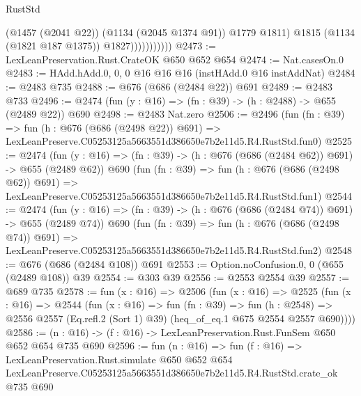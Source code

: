 \begin{lexlean}{RustStd}
\begin{coremodule}
                            (@1457 (@2041 @22))
                            (@1134 (@2045 @1374 @91))
                            @1779
                            @1811)
                          @1815
                          (@1134 (@1821 @187 @1375))
                          @1827)))))))))))
@2473 := LexLeanPreservation.Rust.CrateOK @650 @652 @654
@2474 := Nat.casesOn.{0}
@2483 := HAdd.hAdd.{0, 0, 0} @16 @16 @16 (instHAdd.{0} @16 instAddNat)
@2484 := @2483 @735
@2488 := @676 (@686 (@2484 @22)) @691
@2489 := @2483 @733
@2496 := @2474 (fun (y : @16) => (fn : @39) -> (h : @2488) -> @655 (@2489 @22)) @690
@2498 := @2483 Nat.zero
@2506 := @2496
    (fun (fn : @39) =>
    fun (h : @676 (@686 (@2498 @22)) @691) =>
    LexLeanPreserve.C05253125a5663551d386650e7b2e11d5.R4.RustStd.fun0)
@2525 := @2474
    (fun (y : @16) => (fn : @39) -> (h : @676 (@686 (@2484 @62)) @691) -> @655 (@2489 @62))
    @690
    (fun (fn : @39) =>
    fun (h : @676 (@686 (@2498 @62)) @691) =>
    LexLeanPreserve.C05253125a5663551d386650e7b2e11d5.R4.RustStd.fun1)
@2544 := @2474
    (fun (y : @16) => (fn : @39) -> (h : @676 (@686 (@2484 @74)) @691) -> @655 (@2489 @74))
    @690
    (fun (fn : @39) =>
    fun (h : @676 (@686 (@2498 @74)) @691) =>
    LexLeanPreserve.C05253125a5663551d386650e7b2e11d5.R4.RustStd.fun2)
@2548 := @676 (@686 (@2484 @108)) @691
@2553 := Option.noConfusion.{0, 0} (@655 (@2489 @108)) @39
@2554 := @303 @39
@2556 := @2553 @2554 @39
@2557 := @689 @735
@2578 := fun (x : @16) =>
  @2506
    (fun (x : @16) =>
    @2525
      (fun (x : @16) =>
      @2544
        (fun (x : @16) =>
        fun (fn : @39) =>
        fun (h : @2548) =>
        @2556 @2557 (Eq.refl.{2} (Sort 1) @39) (heq_of_eq.{1} @675 @2554 @2557 @690))))
@2586 := (n : @16) -> (f : @16) -> LexLeanPreservation.Rust.FunSem @650 @652 @654 @735 @690
@2596 := fun (n : @16) =>
  fun (f : @16) =>
  LexLeanPreservation.Rust.simulate
    @650
    @652
    @654
    LexLeanPreserve.C05253125a5663551d386650e7b2e11d5.R4.RustStd.crate_ok
    @735
    @690
\end{coremodule}
\end{lexlean}
